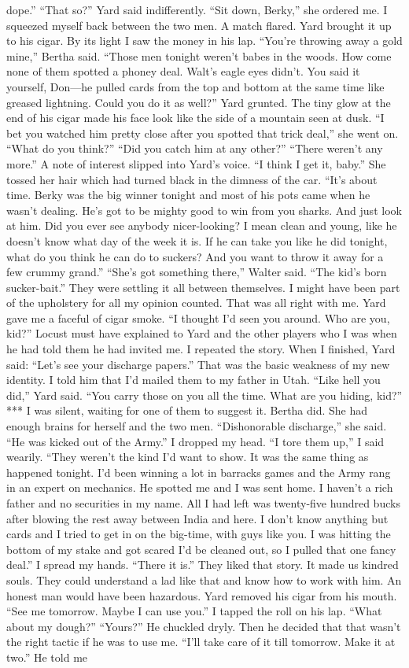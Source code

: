 \documentclass{novel}
\begin{document}
dope.” “That so?” Yard said indifferently. “Sit down, Berky,” she ordered me. I squeezed myself back between the two men. A match flared. Yard brought it up to his cigar. By its light I saw the money in his lap. “You’re throwing away a gold mine,” Bertha said. “Those men tonight weren’t babes in the woods. How come none of them spotted a phoney deal. Walt’s eagle eyes didn’t. You said it yourself, Don—he pulled cards from the top and bottom at the same time like greased lightning. Could you do it as well?” Yard grunted. The tiny glow at the end of his cigar made his face look like the side of a mountain seen at dusk. “I bet you watched him pretty close after you spotted that trick deal,” she went on. “What do you think?” “Did you catch him at any other?” “There weren’t any more.” A note of interest slipped into Yard’s voice. “I think I get it, baby.” She tossed her hair which had turned black in the dimness of the car. “It’s about time. Berky was the big winner tonight and most of his pots came when he wasn’t dealing. He’s got to be mighty good to win from you sharks. And just look at him. Did you ever see anybody nicer-looking? I mean clean and young, like he doesn’t know what day of the week it is. If he can take you like he did tonight, what do you think he can do to suckers? And you want to throw it away for a few crummy grand.” “She’s got something there,” Walter said. “The kid’s born sucker-bait.” They were settling it all between themselves. I might have been part of the upholstery for all my opinion counted. That was all right with me. Yard gave me a faceful of cigar smoke. “I thought I’d seen you around. Who are you, kid?” Locust must have explained to Yard and the other players who I was when he had told them he had invited me. I repeated the story. When I finished, Yard said: “Let’s see your discharge papers.” That was the basic weakness of my new identity. I told him that I’d mailed them to my father in Utah. “Like hell you did,” Yard said. “You carry those on you all the time. What are you hiding, kid?” *** I was silent, waiting for one of them to suggest it. Bertha did. She had enough brains for herself and the two men. “Dishonorable discharge,” she said. “He was kicked out of the Army.” I dropped my head. “I tore them up,” I said wearily. “They weren’t the kind I’d want to show. It was the same thing as happened tonight. I’d been winning a lot in barracks games and the Army rang in an expert on mechanics. He spotted me and I was sent home. I haven’t a rich father and no securities in my name. All I had left was twenty-five hundred bucks after blowing the rest away between India and here. I don’t know anything but cards and I tried to get in on the big-time, with guys like you. I was hitting the bottom of my stake and got scared I’d be cleaned out, so I pulled that one fancy deal.” I spread my hands. “There it is.” They liked that story. It made us kindred souls. They could understand a lad like that and know how to work with him. An honest man would have been hazardous. Yard removed his cigar from his mouth. “See me tomorrow. Maybe I can use you.” I tapped the roll on his lap. “What about my dough?” “Yours?” He chuckled dryly. Then he decided that that wasn’t the right tactic if he was to use me. “I’ll take care of it till tomorrow. Make it at two.” He told me 
\end{document}
